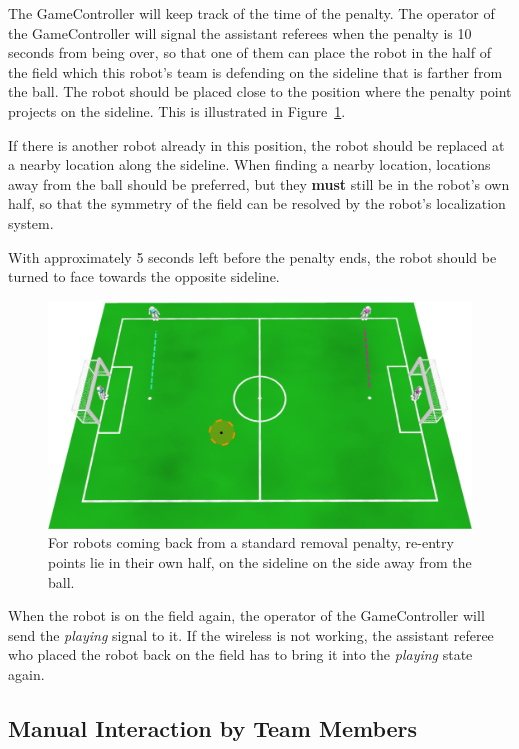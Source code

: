 \documentclass[12pt]{article}
\begin{document}
The GameController will keep track of the time of the penalty. The operator of the GameController will signal the assistant referees when the penalty is 10 seconds from being over, so that one of them can place the robot in the half of the field which this robot's team is defending on the sideline that is farther from the ball. The robot should be placed close to the position where the penalty point projects on the sideline. This is illustrated in Figure~\ref{fig:penalty_re-entry_points}. 

If there is another robot already in this position, the robot should be replaced at a nearby location along the sideline. When finding a nearby location, locations away from the ball should be preferred, but they \textbf{must} still be in the robot's own half, so that the symmetry of the field can be resolved by the robot's localization system.

With approximately 5 seconds left before the penalty ends, the robot should be turned to face towards the opposite sideline.

\begin{figure}[t]
\centerline{\includegraphics[width=\columnwidth]{figs/penalty_re-entry_points.pdf}}
\caption{For robots coming back from a standard removal penalty, re-entry points lie in their own half, on the sideline on the side away from the ball.}
\label{fig:penalty_re-entry_points}
\end{figure}

When the robot is on the field again, the operator of the GameController will send the \emph{playing} signal to it. If the wireless is not working, the assistant referee who placed the robot back on the field has to bring it into the \emph{playing} state again.

\subsection{Manual Interaction by Team Members}
\end{document}
